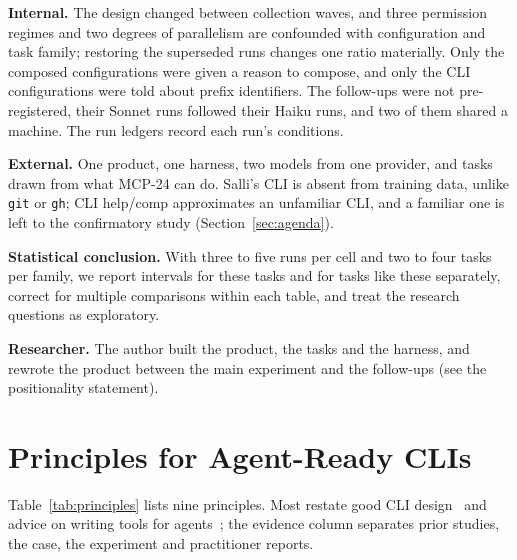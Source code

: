 \documentclass[sigconf,nonacm]{acmart}
\newcommand{\sysA}{Salli}
\newcommand{\cmd}[1]{\texttt{#1}}
\newcommand{\cfg}[1]{\textsf{#1}}
\newcommand{\finding}[1]{\textbf{#1}}
\begin{document}
\finding{Internal.} The design changed between collection waves, and three permission regimes and two degrees of parallelism are confounded with configuration and task family; restoring the superseded runs changes one ratio materially. Only the composed configurations were given a reason to compose, and only the CLI configurations were told about prefix identifiers. The follow-ups were not pre-registered, their Sonnet runs followed their Haiku runs, and two of them shared a machine. The run ledgers record each run's conditions.

\finding{External.} One product, one harness, two models from one provider, and tasks drawn from what \cfg{MCP-24} can do. \sysA{}'s CLI is absent from training data, unlike \cmd{git} or \cmd{gh}; \cfg{CLI help/comp} approximates an unfamiliar CLI, and a familiar one is left to the confirmatory study (Section~\ref{sec:agenda}).

\finding{Statistical conclusion.} With three to five runs per cell and two to four tasks per family, we report intervals for these tasks and for tasks like these separately, correct for multiple comparisons within each table, and treat the research questions as exploratory.

\finding{Researcher.} The author built the product, the tasks and the harness, and rewrote the product between the main experiment and the follow-ups (see the positionality statement).

\section{Principles for Agent-Ready CLIs}
\label{sec:principles}

Table~\ref{tab:principles} lists nine principles. Most restate good CLI design~\cite{clig2020} and advice on writing tools for agents~\cite{anthropic2025writingtools}; the evidence column separates prior studies, the case, the experiment and practitioner reports.
\end{document}
